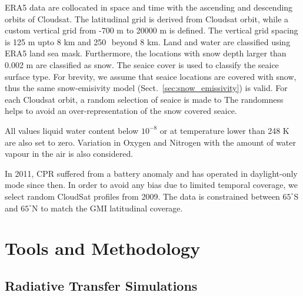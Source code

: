 \documentclass[amt, manuscript]{copernicus}
\begin{document}
ERA5 data are collocated in space and time with the ascending and descending orbits of Cloudsat. The latitudinal grid is derived from Cloudsat orbit, while a custom vertical grid from -700\,\,m to 20000\,\,m is defined. The vertical grid spacing is 125\,\,m upto 8\,\,km and 250\,\, beyond 8\,\,km. Land and water are classified using ERA5 land sea mask. Furthermore, the locations with snow depth larger than 0.002\,\,m are classified as snow. The seaice cover is used to classify the seaice surface type. For brevity, we assume that seaice locations are covered with snow, thus the same snow-emisivity model (Sect.~\ref{sec:snow_emissivity}) is valid. For each Cloudsat orbit,  a random selection of seaice is made to The randomness helps to avoid an over-representation of the snow covered seaice. 

All values liquid water content below $10^{-8}$ or at temperature lower than 248\,\,K are also set to zero. Variation in Oxygen and Nitrogen with the amount of water vapour in the air is also considered.  

In 2011, CPR suffered from a battery anomaly and has operated in daylight-only mode since then. In order to avoid any bias due to limited temporal coverage, we select random CloudSat profiles from 2009. The data is constrained between $65^{\circ}$S and $65^{\circ}$N to match the GMI latitudinal coverage. 


\section{Tools and Methodology}

\subsection{Radiative Transfer Simulations}
\label{sec:rt_simulations}
\end{document}
